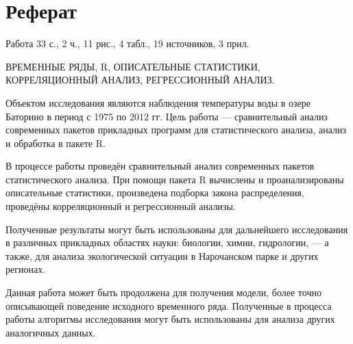 \newpage

\chapter*{Реферат}
Работа 33 с., 2 ч., 11 рис., 4 табл., 19 источников, 3 прил.

ВРЕМЕННЫЕ РЯДЫ, R, ОПИСАТЕЛЬНЫЕ СТАТИСТИКИ, КОРРЕЛЯЦИОННЫЙ АНАЛИЗ, РЕГРЕССИОННЫЙ АНАЛИЗ.

Объектом исследования являются наблюдения температуры воды в озере Баторино в период с 1975 по 2012 гг.
Цель работы --- сравнительный анализ современных пакетов прикладных программ для статистического анализа, анализ и обработка в пакете R.

В процессе работы проведён сравнительный анализ современных пакетов статистического анализа. При помощи пакета R вычислены и проанализированы описательные статистики, произведена подборка закона распределения, проведёны корреляционный и регрессионный анализы.

Полученные результаты могут быть использованы для дальнейшего исследования в различных прикладных областях науки: биологии, химии, гидрологии, --- а также, для анализа экологической ситуации в Нарочанском парке и других регионах.

Данная работа может быть продолжена для получения модели, более точно описывающей поведение исходного временного ряда. Полученные в процесса работы алгоритмы исследования могут быть использованы для анализа других аналогичных данных.